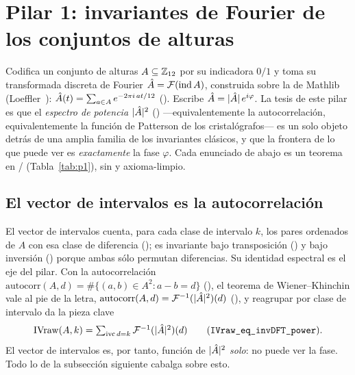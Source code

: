 
\section{Pilar 1: invariantes de Fourier de los conjuntos de alturas}\label{sec:pillar1}


Codifica un conjunto de alturas $A\subseteq\mathbb{Z}_{12}$ por su indicadora $0/1$ y toma su transformada
discreta de Fourier $\hat{A}=\mathcal{F}(\mathrm{ind}\,A)$, construida sobre la  de Mathlib
(Loeffler~\cite{Loeffler}): $\hat{A}(t)=\sum_{a\in A}e^{-2\pi i\,at/12}$ (). Escribe
$\hat{A}=|\hat{A}|\,e^{i\varphi}$. La tesis de este pilar es que el \emph{espectro de potencia} $|\hat{A}|^2$
() ---equivalentemente la autocorrelación, equivalentemente la función de Patterson de los
cristalógrafos--- es un solo objeto detrás de una amplia familia de los invariantes clásicos, y que la
frontera de lo que puede ver es \emph{exactamente} la fase $\varphi$. Cada enunciado de abajo es un teorema en
/ (Tabla~\ref{tab:p1}), sin  y axioma-limpio.

\subsection{El vector de intervalos es la autocorrelación}\label{sec:p1-ivkey}


El vector de intervalos cuenta, para cada clase de intervalo $k$, los pares ordenados de $A$ con esa clase
de diferencia (); es invariante bajo transposición () y bajo inversión
() porque ambas sólo permutan diferencias. Su identidad espectral es el eje del pilar.
Con la autocorrelación $\mathrm{autocorr}(A,d)=\#\{(a,b)\in A^2:a-b=d\}$ (), el teorema de
Wiener--Khinchin vale al pie de la letra, $\mathrm{autocorr}(A,d)=\mathcal{F}^{-1}(|\hat{A}|^2)(d)$
(), y reagrupar por clase de intervalo da la pieza clave
\[
  \mathrm{IVraw}(A,k)=\textstyle\sum_{\mathrm{ivc}\,d=k}\mathcal{F}^{-1}(|\hat{A}|^2)(d)
  \qquad(\texttt{IVraw\_eq\_invDFT\_power}).
\]
El vector de intervalos es, por tanto, función de $|\hat{A}|^2$ \emph{solo}: no puede ver la fase. Todo lo de
la subsección siguiente cabalga sobre esto.


